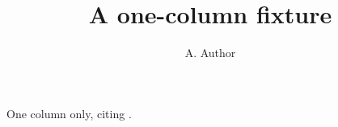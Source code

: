 \documentclass[acmsmall,nonacm]{acmart}
\begin{document}
\title{A one-column fixture}
\author{A. Author}
\maketitle
One column only, citing \cite{ref01}.


\end{document}
